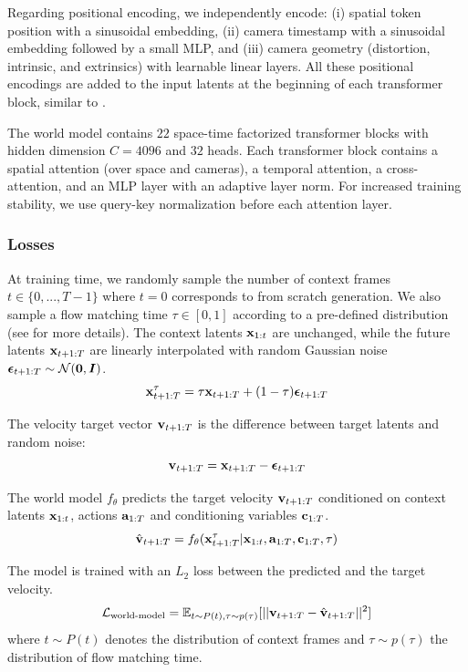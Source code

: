Regarding positional encoding, we independently encode: (i) spatial token position with a sinusoidal embedding, (ii) camera timestamp with a sinusoidal embedding followed by a small MLP, and (iii) camera geometry (distortion, intrinsic, and extrinsics) with learnable linear layers. All these positional encodings are added to the input latents at the beginning of each transformer block, similar to \cite{polyak2024movie}. 

The world model contains $22$ space-time factorized transformer blocks with hidden dimension $C=4096$ and $32$ heads. Each transformer block contains a spatial attention (over space and cameras), a temporal attention, a cross-attention, and an MLP layer with an adaptive layer norm. For increased training stability, we use query-key normalization \cite{dehghani2023scaling} before each attention layer.


\subsubsection{Losses}
At training time, we randomly sample the number of context frames $t \in \{0, ..., T-1\}$ where $t=0$ corresponds to from scratch generation. We also sample a flow matching time $\tau \in [0, 1]$ according to a pre-defined distribution (see  for more details). The context latents ${\mathbf{x}}_{1:t} $ are unchanged, while the future latents ${\mathbf{x}}_{t+1:T} $ are linearly interpolated with random Gaussian noise ${\bm{\epsilon}}_{t+1:T} \sim \mathcal{N}({\bm{0}}, {\bm{I}})$. 
% 
\begin{equation}
    {\mathbf{x}}_{t+1:T}^{\tau} = \tau {\mathbf{x}}_{t+1:T} + (1 - \tau) {\bm{\epsilon}}_{t+1:T}
\end{equation}

The velocity target vector ${\mathbf{v}}_{t+1:T}$ is the difference between target latents and random noise:
% 
\begin{equation}
    {\mathbf{v}}_{t+1:T} = {\mathbf{x}}_{t+1:T} - {\bm{\epsilon}}_{t+1:T}
\end{equation}

The world model $f_{\theta}$ predicts the target velocity ${\mathbf{v}}_{t+1:T}$ conditioned on context latents ${\mathbf{x}}_{1:t}$, actions ${\mathbf{a}}_{1:T}$ and conditioning variables ${\mathbf{c}}_{1:T}$.
% 
\begin{equation}
    \hat{{\mathbf{v}}}_{t+1:T} = f_{\theta}({\mathbf{x}}_{t+1:T}^{\tau} | {\mathbf{x}}_{1:t}, {\mathbf{a}}_{1:T}, {\mathbf{c}}_{1:T}, \tau)
\end{equation}

The model is trained with an $L_2$ loss between the predicted and the target velocity.
% 
\begin{equation}
    \mathcal{L}_{\text{world-model}} = \mathbb{E}_{t \sim P(t), \tau \sim p(\tau)} [||{\mathbf{v}}_{t+1:T} - \hat{{\mathbf{v}}}_{t+1:T} ||^2]
\end{equation}
% 
where $t \sim P(t)$ denotes the distribution of context frames and $\tau \sim p(\tau)$ the distribution of flow matching time.

